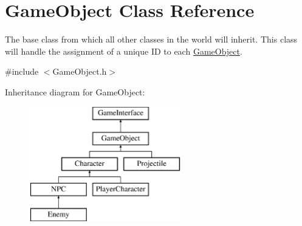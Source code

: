 \hypertarget{class_game_object}{\section{Game\-Object Class Reference}
\label{class_game_object}
}


The base class from which all other classes in the world will inherit. This class will handle the assignment of a unique I\-D to each \hyperlink{class_game_object}{Game\-Object}.  




{\ttfamily \#include $<$Game\-Object.\-h$>$}

Inheritance diagram for Game\-Object\-:\begin{figure}[H]
\begin{center}
\leavevmode
\includegraphics[height=5.000000cm]{class_game_object}
\end{center}
\end{figure}
